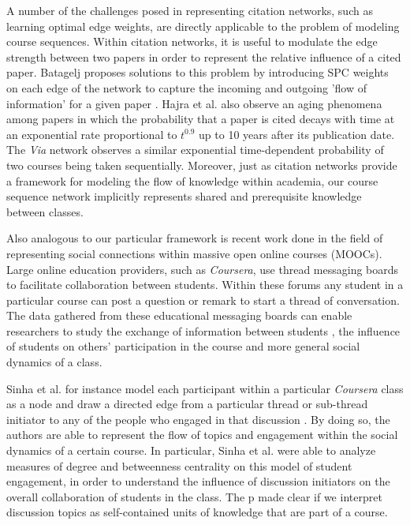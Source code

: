 \documentclass{sigchi}
\begin{document}
A number of the challenges posed in representing citation networks, such as learning optimal edge weights, are directly applicable to the problem of modeling course sequences. Within citation networks, it is useful to modulate the edge strength between two papers in order to represent the relative influence of a cited paper. Batagelj proposes solutions to this problem by introducing SPC weights on each edge of the network to capture the incoming and outgoing 'flow of information' for a given paper \cite{Batagelj2003}. Hajra et al. also observe an aging phenomena among papers in which the probability that a paper is cited decays with time at an exponential rate proportional to $t^{0.9}$ up to 10 years after its publication date. The \emph{Via} network observes a similar exponential time-dependent probability of two courses being taken sequentially. Moreover, just as citation networks provide a framework for modeling the flow of knowledge within academia, our course sequence network implicitly represents shared and prerequisite knowledge between classes. 

Also analogous to our particular framework is recent work done in the field of representing social connections within massive open online courses (MOOCs). Large online education providers, such as \textit{Coursera}, use thread messaging boards to facilitate collaboration between students. Within these forums any student in a particular course can post a question or remark to start a thread of conversation. The data gathered from these educational messaging boards can enable researchers to study the exchange of information between students \cite{Brinton2016}, the influence of students on others' participation in the course \cite{Sinha2014a} and more general social dynamics of a class.

Sinha et al. for instance model each participant within a particular \textit{Coursera} class as a node and draw a directed edge from a particular thread or sub-thread initiator to any of the people who engaged in that discussion \cite{Sinha2014}. By doing so, the authors are able to represent the flow of topics and engagement within the social dynamics of a certain course. In particular, Sinha et al. were able to analyze measures of degree and betweenness centrality on this model of student engagement, in order to understand the influence of discussion initiators on the overall collaboration of students in the class. The p made clear if we interpret discussion topics as self-contained units of knowledge that are part of a course. 
\end{document}
